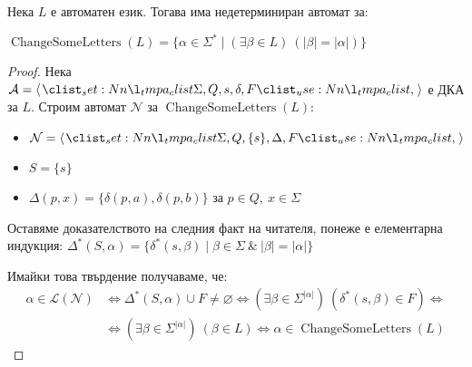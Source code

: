 \begin{claim}
    Нека $L$ е автоматен език.
    Тогава има недетерминиран автомат за:
    \begin{center}
        $\operatorname{ChangeSomeLetters}(L) = \{ \alpha \in \Sigma^* \mid (\exists \beta \in L) \: (|\beta| = |\alpha| ) \}$
    \end{center}
\end{claim}

\begin{proof}
    Нека $\mathcal{A} = \opair{\Sigma, Q, s, \delta, F}$ е ДКА за $L$.
    Строим автомат $\mathcal{N}$ за $\operatorname{ChangeSomeLetters}(L)$:
    \begin{itemize}
        \item $\mathcal{N} = \opair{\Sigma, Q, \{ s \}, \Delta, F}$
        \item $S = \{ s \}$
        \item $\Delta(p, x) = \{ \delta(p, a), \delta(p, b) \}$ за $p \in Q, \: x \in \Sigma$
    \end{itemize}

    Оставяме доказателството на следния факт на читателя, понеже е елементарна индукция:
    $\Delta^*(S, \alpha) = \{ \delta^*(s, \beta) \mid \beta \in \Sigma \: \& \: |\beta| = |\alpha| \}$

    Имайки това твърдение получаваме, че:
    \begin{align*}
        \alpha \in \mathcal{L(N)} & \iff \Delta^*(S, \alpha) \cup F \neq \varnothing \iff (\exists \beta \in \Sigma^{|\alpha|}) \: (\delta^*(s, \beta) \in F) \iff \\
                                  & \iff (\exists \beta \in \Sigma^{|\alpha|}) \: (\beta \in L) \iff \alpha \in \operatorname{ChangeSomeLetters}(L)
    \end{align*}
\end{proof}
